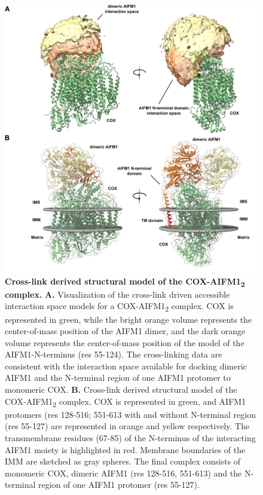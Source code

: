 \begin{figure}[p]
    \center
    \includegraphics[]{Chapter.3/Figures/Figure3.png}
    \caption{\textbf{Cross-link derived structural model of the COX-AIFM1\textsubscript{2} complex.} \textbf{A.} Visualization of the cross-link driven accessible interaction space models for a COX-AIFM1\textsubscript{2} complex. COX is represented in green, while the bright orange volume represents the center-of-mass position of the AIFM1 dimer, and the dark orange volume represents the center-of-mass position of the model of the AIFM1-N-terminus (res 55-124). The cross-linking data are consistent with the interaction space available for docking dimeric AIFM1 and the N-terminal region of one AIFM1 protomer to monomeric COX. \textbf{B.} Cross-link derived structural model of the COX-AIFM1\textsubscript{2} complex. COX is represented in green, and AIFM1 protomers (res 128-516; 551-613 with and without N-terminal region (res 55-127) are represented in orange and yellow respectively. The transmembrane residues (67-85) of the N-terminus of the interacting AIFM1 moiety is highlighted in red. Membrane boundaries of the IMM are sketched as gray spheres. The final complex consists of monomeric COX, dimeric AIFM1 (res 128-516, 551-613) and the N-terminal region of one AIFM1 protomer (res 55-127).}
    \label{fig:ch3_fig3}
\end{figure}
